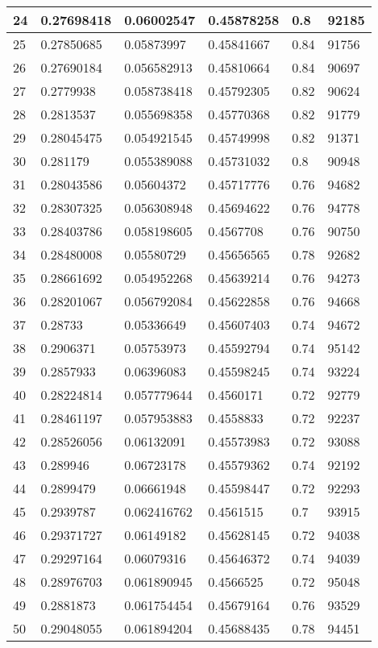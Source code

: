 \begin{longtable}{|l|l|l|l|l|l|}
24 & 0.27698418 & 0.06002547 & 0.45878258 & 0.8 & 92185 \\ \hline 
25 & 0.27850685 & 0.05873997 & 0.45841667 & 0.84 & 91756 \\ \hline 
26 & 0.27690184 & 0.056582913 & 0.45810664 & 0.84 & 90697 \\ \hline 
27 & 0.2779938 & 0.058738418 & 0.45792305 & 0.82 & 90624 \\ \hline 
28 & 0.2813537 & 0.055698358 & 0.45770368 & 0.82 & 91779 \\ \hline 
29 & 0.28045475 & 0.054921545 & 0.45749998 & 0.82 & 91371 \\ \hline 
30 & 0.281179 & 0.055389088 & 0.45731032 & 0.8 & 90948 \\ \hline 
31 & 0.28043586 & 0.05604372 & 0.45717776 & 0.76 & 94682 \\ \hline 
32 & 0.28307325 & 0.056308948 & 0.45694622 & 0.76 & 94778 \\ \hline 
33 & 0.28403786 & 0.058198605 & 0.4567708 & 0.76 & 90750 \\ \hline 
34 & 0.28480008 & 0.05580729 & 0.45656565 & 0.78 & 92682 \\ \hline 
35 & 0.28661692 & 0.054952268 & 0.45639214 & 0.76 & 94273 \\ \hline 
36 & 0.28201067 & 0.056792084 & 0.45622858 & 0.76 & 94668 \\ \hline 
37 & 0.28733 & 0.05336649 & 0.45607403 & 0.74 & 94672 \\ \hline 
38 & 0.2906371 & 0.05753973 & 0.45592794 & 0.74 & 95142 \\ \hline 
39 & 0.2857933 & 0.06396083 & 0.45598245 & 0.74 & 93224 \\ \hline 
40 & 0.28224814 & 0.057779644 & 0.4560171 & 0.72 & 92779 \\ \hline 
41 & 0.28461197 & 0.057953883 & 0.4558833 & 0.72 & 92237 \\ \hline 
42 & 0.28526056 & 0.06132091 & 0.45573983 & 0.72 & 93088 \\ \hline 
43 & 0.289946 & 0.06723178 & 0.45579362 & 0.74 & 92192 \\ \hline 
44 & 0.2899479 & 0.06661948 & 0.45598447 & 0.72 & 92293 \\ \hline 
45 & 0.2939787 & 0.062416762 & 0.4561515 & 0.7 & 93915 \\ \hline 
46 & 0.29371727 & 0.06149182 & 0.45628145 & 0.72 & 94038 \\ \hline 
47 & 0.29297164 & 0.06079316 & 0.45646372 & 0.74 & 94039 \\ \hline 
48 & 0.28976703 & 0.061890945 & 0.4566525 & 0.72 & 95048 \\ \hline 
49 & 0.2881873 & 0.061754454 & 0.45679164 & 0.76 & 93529 \\ \hline 
50 & 0.29048055 & 0.061894204 & 0.45688435 & 0.78 & 94451 \\ \hline 
\end{longtable}
